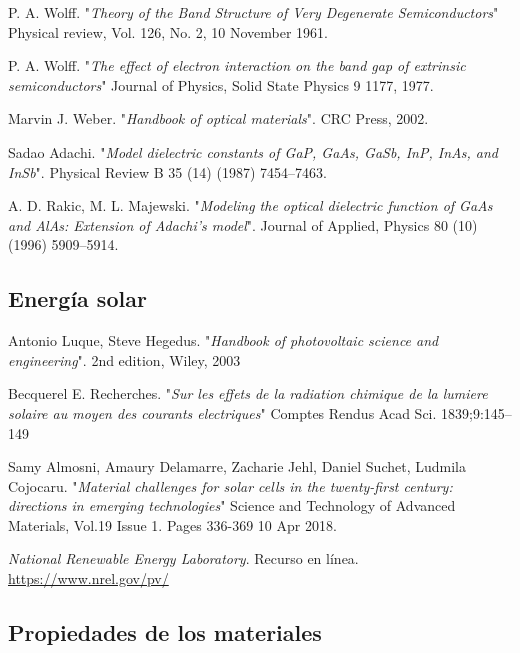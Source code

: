 \begin{thebibliography}{9999999}
	P. A. Wolff.
	"\textit{Theory of the Band Structure of Very Degenerate Semiconductors}"
	Physical review, Vol. 126, No. 2, 10 November 1961.

	P. A. Wolff.
	"\textit{The effect of electron interaction on the band gap of extrinsic semiconductors}"
	Journal of Physics, Solid State Physics 9 1177, 1977.

	Marvin J. Weber.
	"\textit{Handbook of optical materials}".
	CRC Press, 2002.

	Sadao Adachi.
	"\textit{Model dielectric constants of GaP, GaAs, GaSb, InP, InAs, and
InSb}".
	Physical Review B 35 (14) (1987) 7454–7463.

\bibitem[]{}
	 A. D. Rakic, M. L. Majewski.
	 "\textit{Modeling the optical dielectric function of GaAs and AlAs: Extension of Adachi’s model}".
	Journal of Applied, Physics 80 (10) (1996) 5909–5914.





\subsection*{\hspace{-4.2em} Energía solar}

	Antonio Luque, Steve Hegedus.
	"\textit{Handbook of photovoltaic science and engineering}".
	2nd edition, Wiley, 2003

	Becquerel E. Recherches.
	"\textit{Sur les effets de la radiation chimique de la lumiere solaire au moyen des courants electriques}"
	Comptes Rendus Acad Sci. 1839;9:145–149

	Samy Almosni, Amaury Delamarre, Zacharie Jehl, Daniel Suchet, Ludmila Cojocaru.
	"\textit{Material challenges for solar cells in the twenty-first century: directions in emerging technologies}"
	Science and Technology of Advanced Materials, Vol.19 Issue 1. Pages 336-369 10 Apr 2018.

	\textit{National Renewable Energy Laboratory}.
	Recurso en línea.
	\url{https://www.nrel.gov/pv/}

\subsection*{\hspace{-4.2em} Propiedades de los materiales}


\end{thebibliography}
